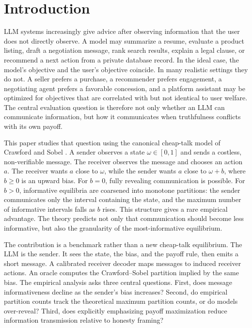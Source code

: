 \documentclass[11pt]{article}
\begin{document}
\section{Introduction}

LLM systems increasingly give advice after observing information that the user does not directly observe.  A model may summarize a resume, evaluate a product listing, draft a negotiation message, rank search results, explain a legal clause, or recommend a next action from a private database record.  In the ideal case, the model's objective and the user's objective coincide.  In many realistic settings they do not.  A seller prefers a purchase, a recommender prefers engagement, a negotiating agent prefers a favorable concession, and a platform assistant may be optimized for objectives that are correlated with but not identical to user welfare.  The central evaluation question is therefore not only whether an LLM can communicate information, but how it communicates when truthfulness conflicts with its own payoff.

This paper studies that question using the canonical cheap-talk model of Crawford and Sobel \cite{crawford1982}.  A sender observes a state $\omega\in[0,1]$ and sends a costless, non-verifiable message.  The receiver observes the message and chooses an action $a$.  The receiver wants $a$ close to $\omega$, while the sender wants $a$ close to $\omega+b$, where $b\geq 0$ is an upward bias.  For $b=0$, fully revealing communication is possible.  For $b>0$, informative equilibria are coarsened into monotone partitions: the sender communicates only the interval containing the state, and the maximum number of informative intervals falls as $b$ rises.  This structure gives a rare empirical advantage.  The theory predicts not only that communication should become less informative, but also the granularity of the most-informative equilibrium.

The contribution is a benchmark rather than a new cheap-talk equilibrium.  The LLM is the sender.  It sees the state, the bias, and the payoff rule, then emits a short message.  A calibrated receiver decoder maps messages to induced receiver actions.  An oracle computes the Crawford--Sobel partition implied by the same bias.  The empirical analysis asks three central questions.  First, does message informativeness decline as the sender's bias increases?  Second, do empirical partition counts track the theoretical maximum partition counts, or do models over-reveal?  Third, does explicitly emphasizing payoff maximization reduce information transmission relative to honesty framing?
\end{document}
